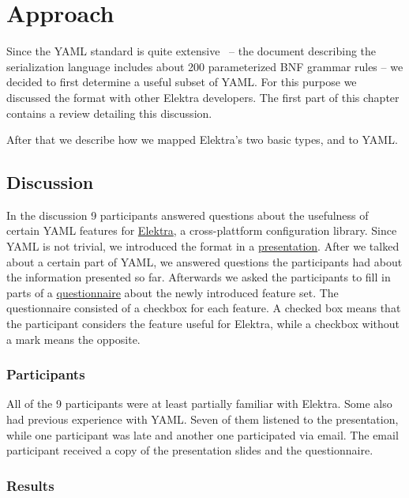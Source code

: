 \chapter{Approach}

Since the YAML standard is quite extensive~\cite{ben2009yaml} – the document describing the serialization language includes about 200 parameterized \gls{BNF} grammar rules – we decided to first determine a useful subset of YAML. For this purpose we discussed the format with other Elektra developers. The first part of this chapter contains a review detailing this discussion.

After that we describe how we mapped Elektra’s two basic types,  and  to YAML.

\section{Discussion}

In the discussion 9 participants answered questions about the usefulness of certain YAML features for \href{https://www.libelektra.org}{Elektra}, a cross-plattform configuration library. Since YAML is not trivial, we introduced the format in a \href{https://github.com/sanssecours/YAML-Presentation/releases/download/v1.0/Presentation.pdf}{presentation}. After we talked about a certain part of YAML, we answered questions the participants had about the information presented so far. Afterwards we asked the participants to fill in parts of a \href{https://github.com/sanssecours/YAML-Presentation/blob/master/Questionnaire.md}{questionnaire} about the newly introduced feature set. The questionnaire consisted of a checkbox for each feature. A checked box means that the participant considers the feature useful for Elektra, while a checkbox without a mark means the opposite.

\subsection{Participants}

All of the 9 participants were at least partially familiar with Elektra. Some also had previous experience with YAML. Seven of them listened to the presentation, while one participant was late and another one participated via email. The email participant received a copy of the presentation slides and the questionnaire.

\subsection{Results}

